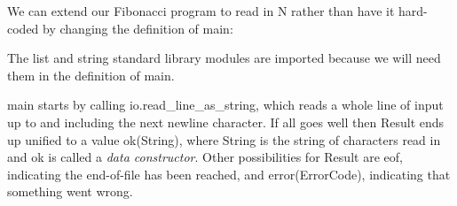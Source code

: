 \documentclass[a4paper,11pt,notitlepage,onecolumn]{book}
\begin{document}
We can extend our Fibonacci program to read in \textsf{N} rather than have it
hard-coded by changing the definition of \textsf{main}:
\begin{small}

\begin{ptabular}
\nextline
\nextline
{}
\nextline
{}
\nextline
{}
\nextline
{}
\nextline
{}
\nextline
{}
\nextline
{}
\nextline
{}
\nextline
{}
\nextline
{}
\nextline
\end{ptabular}

\end{small}
The \textsf{list} and \textsf{string} standard library modules are imported because we
will need them in the definition of \textsf{main}.

\textsf{main} starts by calling \textsf{io.read\_line\_as\_string}, which reads a whole line
of input up to and including the next newline character.  If all goes well
then \textsf{Result} ends up unified to a value \textsf{ok(String)}, where \textsf{String} is the
string of characters read in and \textsf{ok} is called a \emph{data constructor}.
Other possibilities for \textsf{Result} are \textsf{eof}, indicating the end-of-file has
been reached, and \textsf{error(ErrorCode)}, indicating that something went wrong.
\end{document}
